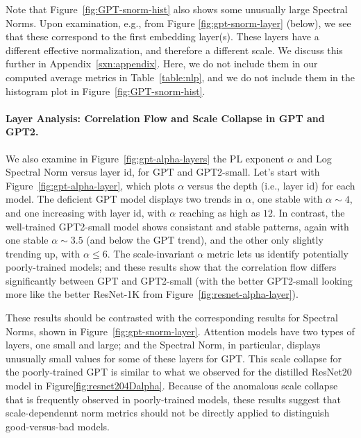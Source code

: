 Note that Figure~\ref{fig:GPT-snorm-hist} also shows some unusually large Spectral Norms.
Upon examination, e.g., from Figure \ref{fig:gpt-snorm-layer} (below), we see that these correspond to the first embedding layer(s).
These layers have a different effective normalization, and therefore a different scale.
We discuss this further in Appendix~\ref{sxn:appendix}.
Here, we do not include them in our computed average metrics in Table~\ref{table:nlp}, and we do not include them in the histogram plot in Figure~\ref{fig:GPT-snorm-hist}.



\paragraph{Layer Analysis: Correlation Flow and Scale Collapse in GPT and GPT2.} 

We also examine in Figure~\ref{fig:gpt-alpha-layers} the PL exponent $\alpha$ and Log Spectral Norm versus layer id, for GPT and GPT2-small.
Let's start with Figure~\ref{fig:gpt-alpha-layer}, which plots $\alpha$ versus the depth (i.e., layer id) for each model.
The deficient GPT model displays two trends in $\alpha$, one stable with $\alpha\sim 4$, and one increasing with layer id, with $\alpha$ reaching as high as $12$.
In contrast, the well-trained GPT2-small model shows consistant and stable patterns, again with one stable $\alpha\sim 3.5$ (and below the GPT trend), and the other only slightly trending up, with $\alpha\le 6$. 
The scale-invariant $\alpha$ metric lets us identify potentially poorly-trained models; and these results show that the correlation flow differs significantly between GPT and GPT2-small (with the better GPT2-small looking more like the better ResNet-1K from Figure~\ref{fig:resnet-alpha-layer}).

These results should be contrasted with the corresponding results for Spectral Norms, shown in Figure~\ref{fig:gpt-snorm-layer}.
Attention models have two types of layers, one small and large; and the Spectral Norm, in particular, displays unusually small values for some of these layers for GPT.
This scale collapse for the poorly-trained GPT is similar to what we observed for the distilled ResNet20 model in Figure\ref{fig:resnet204Dalpha}.
Because of the anomalous scale collapse that is frequently observed in poorly-trained models, these results suggest that scale-dependennt norm metrics should not be directly applied to distinguish good-versus-bad models. 


